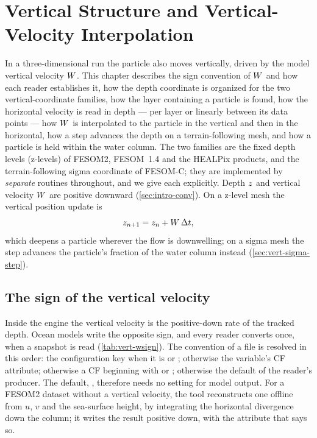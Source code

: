 \chapter{Vertical Structure and Vertical-Velocity Interpolation}\label{ch:vertical}

In a three-dimensional run the particle also moves vertically, driven by the model vertical velocity
$W$. This chapter describes the sign convention of $W$ and how each reader establishes it,
how the depth coordinate is organized for the two vertical-coordinate families, how the layer
containing a particle is found, how the horizontal velocity is read in depth --- per layer or linearly
between its data points --- how $W$ is interpolated to the particle in the vertical and then
in the horizontal, how a step advances the depth on a terrain-following mesh, and how a particle is
held within the water column. The two families are the fixed depth levels (z-levels) of FESOM2, FESOM~1.4
and the HEALPix products, and the terrain-following sigma coordinate of FESOM-C; they are implemented by
\emph{separate} routines throughout, and we give each explicitly. Depth $z$ and vertical velocity
$W$ are positive downward (\cref{sec:intro-conv}). On a z-level mesh the vertical position update
is
\begin{equation}\label{eq:vert-update}
  z_{n+1} = z_n + W\,\Delta t ,
\end{equation}
which deepens a particle wherever the flow is downwelling; on a sigma mesh the step advances the
particle's fraction of the water column instead (\cref{sec:vert-sigma-step}).

\section{The sign of the vertical velocity}\label{sec:vert-wsign}

Inside the engine the vertical velocity is the positive-down rate of the tracked depth. Ocean models
write the opposite sign, and every reader converts once, when a snapshot is read
(\cref{tab:vert-wsign}). The convention of a file is resolved in this order: the configuration key
 when it is  or ; otherwise the variable's CF
 attribute; otherwise a CF  beginning with  or
; otherwise the default of the reader's producer. The default, , therefore
needs no setting for model output. For a FESOM2 dataset without a vertical velocity, the tool
 reconstructs one offline from $u$, $v$ and the sea-surface height, by
integrating the horizontal divergence down the column; it writes the result positive down, with the
attribute that says so.

